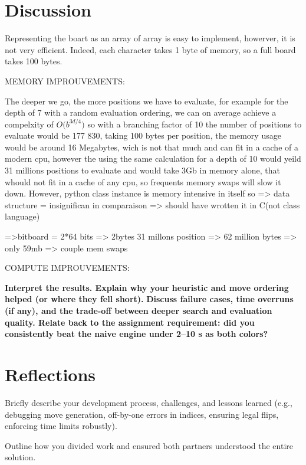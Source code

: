 \documentclass[10pt, titlepage, oneside, a4paper]{article}
\begin{document}
\section{Discussion}
\label{sec:discussion}
Representing the boart as an array of array is easy to implement, howerver, it is not very efficient. Indeed, each character takes 1 byte of memory, so a full board takes 100 bytes. 

MEMORY IMPROUVEMENTS:


The deeper we go, the more positions we have to evaluate, for example for the depth of 7 with a random evaluation ordering, we can on average achieve a compelxity of $O\big(b^{3d/4}\big)$ \textcite{alpha_beta_complexity} so with a branching factor of 10 the number of positions to evaluate would be 177 830, taking 100 bytes per position, the memory usage would be around 16 Megabytes, wich is not that much and can fit in a cache of a modern cpu, however the using the same calculation for a depth of 10 would yeild 31 millions positions to evaluate and would take 3Gb in memory alone, that whould not fit in a cache of any cpu, so frequents memory swaps will slow it down. However, python class instance is memory intensive in itself so => data structure = insignifican in comparaison => should have wrotten it in C(not class language)

=>bitboard = 2*64 bits => 2bytes
31 millons position => 62 million bytes => only 59mb => couple mem swaps


COMPUTE IMPROUVEMENTS:





\textbf{Interpret the results. Explain why your heuristic and move ordering helped (or where they fell short).}
\textbf{Discuss failure cases, time overruns (if any), and the trade-off between deeper search and evaluation quality.
Relate back to the assignment requirement: did you consistently beat the naive engine under 2--10 s as both colors?}


\section{Reflections}
\label{sec:reflections}
Briefly describe your development process, challenges, and lessons learned (e.g., debugging move generation, off-by-one errors in indices, ensuring legal flips, enforcing time limits robustly).

Outline how you divided work and ensured both partners understood the entire solution.
\textcite{brianothello2005}
\textcite{buro1995othello}
\textcite{jaskowski2014ntuple}
\end{document}
